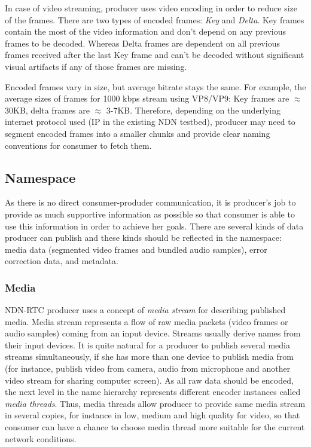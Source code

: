 \documentclass{icn/sig-alternate-2012} %
\newcommand{\ndnrtcName}{NDN-RTC} %
\begin{document}
In case of video streaming, producer uses video encoding in order to reduce size of the frames. There are two types of encoded frames: \textit{Key} and \textit{Delta}. Key frames contain the most of the video information and don't depend on any previous frames to be decoded. Whereas Delta frames are dependent on all previous frames received after the last Key frame and can't be decoded without significant visual artifacts if any of those frames are missing.

Encoded frames vary in size, but average bitrate stays the same. For example, the average sizes of frames for 1000 kbps stream using VP8/VP9: Key frames are $\approx$ 30KB, delta frames are $\approx$ 3-7KB.
Therefore, depending on the underlying internet protocol used (IP in the existing NDN testbed), producer may need to segment encoded frames into a smaller chunks and provide clear naming conventions for consumer to fetch them.




\subsection{Namespace}

As there is no direct consumer-produder communication, it is producer's job to provide as much supportive information as possible so that consumer is able to use this information in order to achieve her goals. There are several kinds of data producer can publish and these kinds should be reflected in the namespace:
media data (segmented video frames and bundled audio samples), error correction data, and metadata. 


\subsubsection{Media} 

\ndnrtcName{} producer uses a concept of \textit{media stream} for describing published media. Media stream represents a flow of raw media packets (video frames or audio samples) coming from an input device. Streams usually derive names from their input devices. It is quite natural for a producer to publish several media streams simultaneously, if she has more than one device to publish media from (for instance, publish video from camera, audio from microphone and another video stream for sharing computer screen). As all raw data should be encoded, the next level in the name hierarchy represents different encoder instances called \textit{media threads}. Thus, media threads allow producer to provide same media stream in several copies, for instance in low, medium and high quality for video, so that consumer can have a chance to choose media thread more suitable for the current network conditions.
\end{document}
